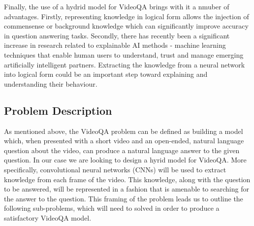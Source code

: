 \documentclass[../interim.tex]{subfiles}
\begin{document}
Finally, the use of a hydrid model for VideoQA brings with it a nmuber of advantages. Firstly, representing knowledge in logical form allows the injection of commensense or background knowledge which can significantly improve accuracy in question answering tasks\cite{motivation:external-knowledge}. Secondly, there has recently been a significant increase in research related to explainable AI methods - machine learning techniques that enable human users to understand, trust and manage emerging artificially intelligent partners\cite{def:xai}. Extracting the knowledge from a neural network into logical form could be an important step toward explaining and understanding their behaviour.


\subsection{Problem Description}

As mentioned above, the VideoQA problem can be defined as building a model which, when presented with a short video and an open-ended, natural language question about the video, can produce a natural language answer to the given question. In our case we are looking to design a hyrid model for VideoQA. More specifically, convolutional neural networks (CNNs) will be used to extract knowledge from each frame of the video. This knowledge, along with the question to be answered, will be represented in a fashion that is amenable to searching for the answer to the question. This framing of the problem leads us to outline the following sub-problems, which will need to solved in order to produce a satisfactory VideoQA model.
\end{document}

